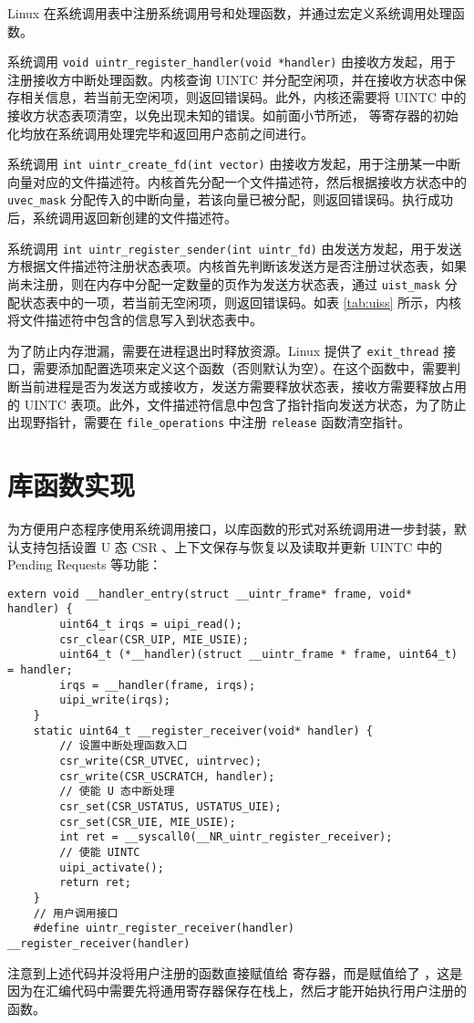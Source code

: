 Linux 在系统调用表中注册系统调用号和处理函数，并通过宏定义系统调用处理函数。

系统调用 \texttt{void uintr_register_handler(void *handler)} 由接收方发起，用于注册接收方中断处理函数。内核查询 UINTC 并分配空闲项，并在接收方状态中保存相关信息，若当前无空闲项，则返回错误码。此外，内核还需要将 UINTC 中的接收方状态表项清空，以免出现未知的错误。如前面小节所述， \Rsuirs 等寄存器的初始化均放在系统调用处理完毕和返回用户态前之间进行。

系统调用 \texttt{int uintr_create_fd(int vector)} 由接收方发起，用于注册某一中断向量对应的文件描述符。内核首先分配一个文件描述符，然后根据接收方状态中的 \texttt{uvec\_mask} 分配传入的中断向量，若该向量已被分配，则返回错误码。执行成功后，系统调用返回新创建的文件描述符。

系统调用 \texttt{int uintr_register_sender(int uintr_fd)} 由发送方发起，用于发送方根据文件描述符注册状态表项。内核首先判断该发送方是否注册过状态表，如果尚未注册，则在内存中分配一定数量的页作为发送方状态表，通过 \texttt{uist\_mask} 分配状态表中的一项，若当前无空闲项，则返回错误码。如表 \ref{tab:uiss} 所示，内核将文件描述符中包含的信息写入到状态表中。

为了防止内存泄漏，需要在进程退出时释放资源。Linux 提供了 \texttt{exit\_thread} 接口，需要添加配置选项来定义这个函数（否则默认为空）。在这个函数中，需要判断当前进程是否为发送方或接收方，发送方需要释放状态表，接收方需要释放占用的 UINTC 表项。此外，文件描述符信息中包含了指针指向发送方状态，为了防止出现野指针，需要在 \texttt{file\_operations} 中注册 \texttt{release} 函数清空指针。

\section{库函数实现}

为方便用户态程序使用系统调用接口，以库函数的形式对系统调用进一步封装，默认支持包括设置 U 态 CSR 、上下文保存与恢复以及读取并更新 UINTC 中的 Pending Requests 等功能：

\begin{lstlisting}[style=CStyle]
    extern void __handler_entry(struct __uintr_frame* frame, void* handler) {
        uint64_t irqs = uipi_read();
        csr_clear(CSR_UIP, MIE_USIE);
        uint64_t (*__handler)(struct __uintr_frame * frame, uint64_t) = handler;
        irqs = __handler(frame, irqs);
        uipi_write(irqs);
    }
    static uint64_t __register_receiver(void* handler) {
        // 设置中断处理函数入口
        csr_write(CSR_UTVEC, uintrvec);
        csr_write(CSR_USCRATCH, handler);
        // 使能 U 态中断处理
        csr_set(CSR_USTATUS, USTATUS_UIE);
        csr_set(CSR_UIE, MIE_USIE);
        int ret = __syscall0(__NR_uintr_register_receiver);
        // 使能 UINTC 
        uipi_activate();
        return ret;
    }
    // 用户调用接口
    #define uintr_register_receiver(handler) __register_receiver(handler)
\end{lstlisting}

注意到上述代码并没将用户注册的函数直接赋值给 \Rutvec 寄存器，而是赋值给了 \Ruscratch ，这是因为在汇编代码中需要先将通用寄存器保存在栈上，然后才能开始执行用户注册的函数。

